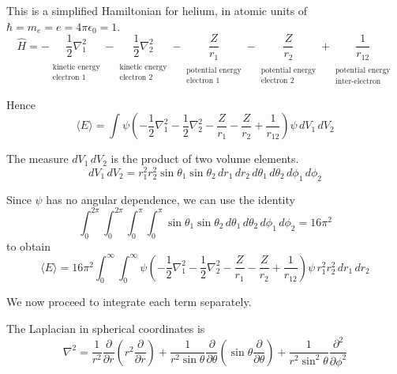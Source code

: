 \documentclass[12pt]{article}
\begin{document}
This is a simplified Hamiltonian for helium, in atomic units of $\hbar=m_e=e=4\pi\epsilon_0=1$.
\begin{equation*}
\hat{H}=
-\underset{\substack{\\[1ex]\text{kinetic energy}\\\text{electron 1}}}{\frac{1}{2}\nabla^2_1}
-\underset{\substack{\\[1ex]\text{kinetic energy}\\\text{electron 2}}}{\frac{1}{2}\nabla^2_2}
-\underset{\substack{\\[1ex]\text{potential energy}\\\text{electron 1}}}{\frac{Z}{r_1}}
-\underset{\substack{\\[1ex]\text{potential energy}\\\text{electron 2}}}{\frac{Z}{r_2}}
+\underset{\substack{\\[1ex]\text{potential energy}\\\text{inter-electron}}}{\frac{1}{r_{12}}}
\end{equation*}

Hence
\begin{equation*}
\langle E\rangle=
\int\psi\left(
-\frac{1}{2}\nabla^2_1
-\frac{1}{2}\nabla^2_2
-\frac{Z}{r_1}
-\frac{Z}{r_2}
+\frac{1}{r_{12}}
\right)\psi\,dV_1\,dV_2
\end{equation*}

The measure $dV_1\,dV_2$ is the product of two volume elements.
\begin{equation*}
dV_1\,dV_2=r_1^2 r_2^2 \sin\theta_1 \sin\theta_2
\,dr_1\,dr_2\,d\theta_1\,d\theta_2\,d\phi_1\,d\phi_2
\end{equation*}

Since $\psi$ has no angular dependence, we can use the identity
\begin{equation*}
\int_0^{2\pi}\int_0^{2\pi}\int_0^\pi\int_0^\pi\sin\theta_1\sin\theta_2
\,d\theta_1\,d\theta_2\,d\phi_1\,d\phi_2=16\pi^2
\tag{1}
\end{equation*}
to obtain
\begin{equation*}
\langle E\rangle=16\pi^2\int_0^\infty\int_0^\infty
\psi\left(
-\frac{1}{2}\nabla^2_1
-\frac{1}{2}\nabla^2_2
-\frac{Z}{r_1}
-\frac{Z}{r_2}
+\frac{1}{r_{12}}
\right)\psi
\,r_1^2 r_2^2
\,dr_1\,dr_2
\end{equation*}

We now proceed to integrate each term separately.

\bigskip
The Laplacian in spherical coordinates is
\begin{equation*}
\nabla^2=\frac{1}{r^2}\frac{\partial}{\partial r}
\left(r^2\frac{\partial}{\partial r}\right)
+
\frac{1}{r^2\sin\theta}\frac{\partial}{\partial\theta}
\left(\sin\theta\frac{\partial}{\partial\theta}\right)
+
\frac{1}{r^2\sin^2\theta}\frac{\partial^2}{\partial\phi^2}
\end{equation*}
\end{document}
